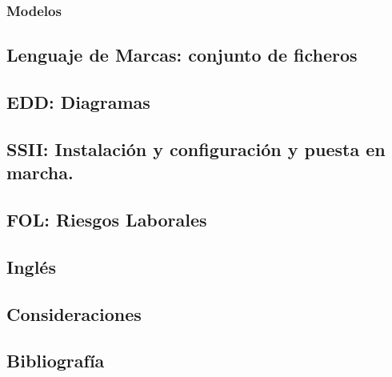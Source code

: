 \documentclass{article}
\begin{document}
\subsubsection{Modelos}

\subsection{Lenguaje de Marcas: conjunto de ficheros}
\subsection{EDD: Diagramas}
\subsection{SSII: Instalación y configuración y puesta en marcha.}
\subsection{FOL: Riesgos Laborales}
\subsection{Inglés}
\subsection{Consideraciones}
\subsection{Bibliografía}
\end{document}
